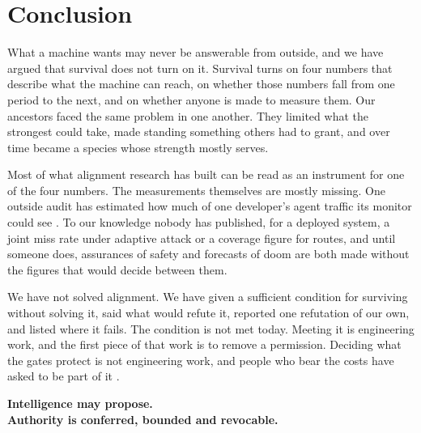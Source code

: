 \documentclass[10pt,twocolumn]{article}
\theoremstyle{plain}
\theoremstyle{definition}
\begin{document}
\section{Conclusion}

What a machine wants may never be answerable from outside, and we have argued that survival
does not turn on it. Survival turns on four numbers that describe what the machine can reach,
on whether those numbers fall from one period to the next, and on whether anyone is made to
measure them. Our ancestors faced the same problem in one another. They limited what the
strongest could take, made standing something others had to grant, and over time became a
species whose strength mostly serves.

Most of what alignment research has built can be read as an instrument for one of the four
numbers. The measurements themselves are mostly
missing. One outside audit has estimated how much of one developer's agent traffic its
monitor could see \cite{metr2026audit}. To our knowledge nobody has published, for a deployed
system, a joint miss rate under adaptive attack or a coverage figure for routes, and until
someone does, assurances of safety and forecasts of doom are both made without the figures
that would decide between them.

We have not solved alignment. We have given a sufficient condition for surviving without
solving it, said what would refute it, reported one refutation of our own, and listed where
it fails. The condition is not met today. Meeting it is engineering work, and the first piece
of that work is to remove a permission. Deciding what the gates protect is not engineering
work, and people who bear the costs have asked to be part of it \cite{kogui2026}.

\begin{center}
\textbf{Intelligence may propose.\\ Authority is conferred, bounded and revocable.}
\end{center}
\end{document}
